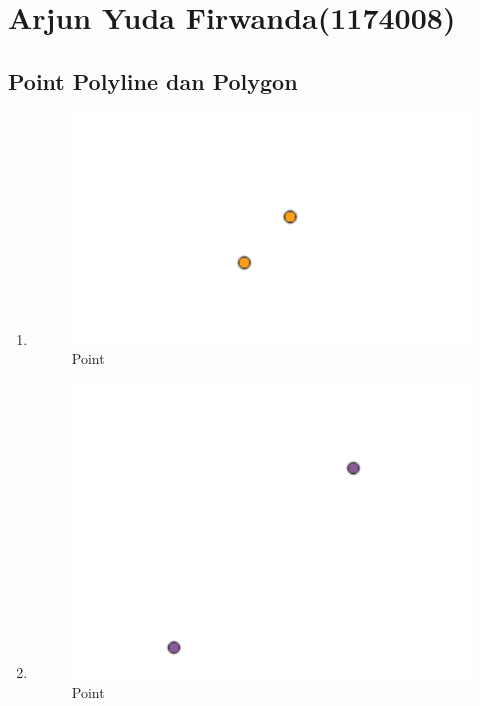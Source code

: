 \section{Arjun Yuda Firwanda(1174008)}
\subsection{Point Polyline dan Polygon}
\begin{enumerate}
	\item 
	
	\begin{figure}[H]
		\includegraphics[width=12cm]{figures/1174008/2/hasilsoal1.PNG}
		\centering
		\caption{Point}
	\end{figure}
	
	\item 
	
	\begin{figure}[H]
		\includegraphics[width=12cm]{figures/1174008/2/hasilsoal2.PNG}
		\centering
		\caption{Point}
	\end{figure}
	

\end{enumerate}
